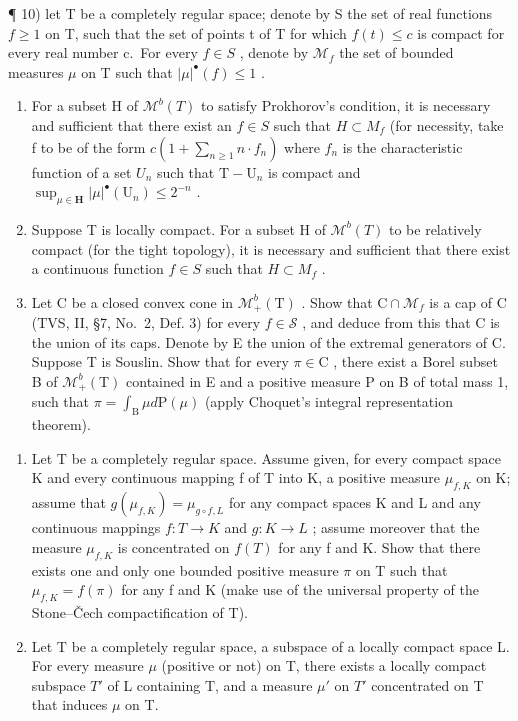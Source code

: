 ¶ 10) let T be a completely regular space; denote by S the set of real functions \(f \geqslant 1\) on T, such that the set of points t of T for which \(f(t) \leqslant c\) is compact for every real number c.~For every \(f \in S\) , denote by \(\mathcal{M}_f\) the set of bounded measures \(\mu\) on T such that \(|\mu|^{\bullet}(f) \leqslant 1\) .

\begin{enumerate}
\def\labelenumi{\alph{enumi})}
\item
  For a subset H of \(\mathcal{M}^{b}(T)\) to satisfy Prokhorov's condition, it is necessary and sufficient that there exist an \(f \in S\) such that \(H \subset M_{f}\) (for necessity, take f to be of the form \(c(1 + \sum_{n \geqslant 1} n \cdot f_{n})\) where \(f_{n}\) is the characteristic function of a set \(U_{n}\) such that \(\mathrm{T} - \mathrm{U}_n\) is compact and \(\sup_{\mu \in \mathbf{H}} |\mu|^{\bullet} (\mathrm{U}_n) \leqslant 2^{-n}\) .
\item
  Suppose T is locally compact. For a subset H of \(\mathcal{M}^{b}(T)\) to be relatively compact (for the tight topology), it is necessary and sufficient that there exist a continuous function \(f \in S\) such that \(H \subset M_{f}\) .
\item
  Let C be a closed convex cone in \(\mathcal{M}_{+}^{b}(\mathrm{T})\) . Show that \(\mathrm{C} \cap \mathcal{M}_{f}\) is a cap of C (TVS, II, §7, No.~2, Def. 3) for every \(f \in \mathcal{S}\) , and deduce from this that C is the union of its caps. Denote by E the union of the extremal generators of C. Suppose T is Souslin. Show that for every \(\pi \in \mathrm{C}\) , there exist a Borel subset B of \(\mathcal{M}_{+}^{b}(\mathrm{T})\) contained in E and a positive measure P on B of total mass 1, such that \(\pi = \int_{\mathrm{B}} \mu d\mathrm{P}(\mu)\) (apply Choquet's integral representation theorem).
\end{enumerate}

\begin{enumerate}
\def\labelenumi{\arabic{enumi})}
\setcounter{enumi}{10}
\item
  Let T be a completely regular space. Assume given, for every compact space K and every continuous mapping f of T into K, a positive measure \(\mu_{f,K}\) on K; assume that \(g(\mu_{f,K}) = \mu_{g \circ f,L}\) for any compact spaces K and L and any continuous mappings \(f : T \to K\) and \(g : K \to L\) ; assume moreover that the measure \(\mu_{f,K}\) is concentrated on \(f(T)\) for any f and K. Show that there exists one and only one bounded positive measure \(\pi\) on T such that \(\mu_{f,K} = f(\pi)\) for any f and K (make use of the universal property of the Stone--Čech compactification of T).
\item
  Let T be a completely regular space, a subspace of a locally compact space L. For every measure \(\mu\) (positive or not) on T, there exists a locally compact subspace \(T'\) of L containing T, and a measure \(\mu'\) on \(T'\) concentrated on T that induces \(\mu\) on T.
\end{enumerate}

